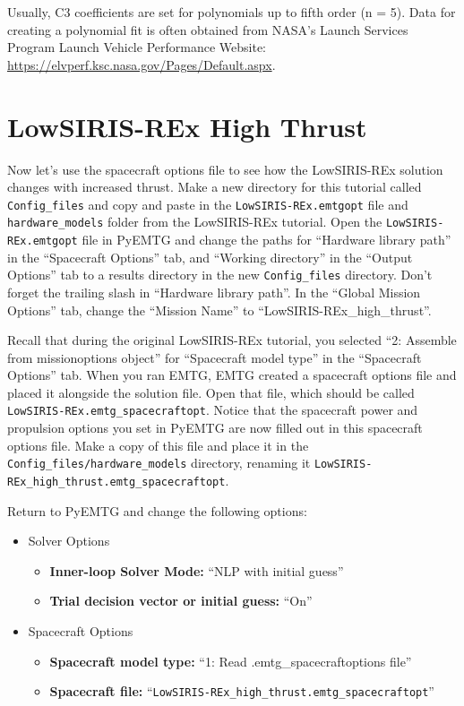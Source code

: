 \documentclass[11pt]{article}
\begin{document}
\noindent Usually, C3 coefficients are set for polynomials up to fifth order (n = 5). Data for creating a polynomial fit is often obtained from \acs{NASA}’s Launch Services Program Launch Vehicle Performance Website: \url{https://elvperf.ksc.nasa.gov/Pages/Default.aspx}.


\section{LowSIRIS-REx High Thrust}
\label{sec:lowsiris_rex_high_thrust}

Now let’s use the spacecraft options file to see how the LowSIRIS-REx solution changes with increased thrust. Make a new directory for this tutorial called \texttt{Config\_files} and copy and paste in the \texttt{LowSIRIS-REx.emtgopt} file and \texttt{hardware\_models} folder from the LowSIRIS-REx tutorial. Open the \texttt{LowSIRIS-REx.emtgopt} file in PyEMTG and change the paths for ``Hardware library path'' in the ``Spacecraft Options'' tab,  and ``Working directory'' in the ``Output Options'' tab to a results directory in the new \texttt{Config\_files} directory. Don’t forget the trailing slash in ``Hardware library path''. In the ``Global Mission Options'' tab, change the ``Mission Name'' to ``LowSIRIS-REx\_high\_thrust”.

\noindent Recall that during the original LowSIRIS-REx tutorial, you selected ``2: Assemble from missionoptions object'' for ``Spacecraft model type'' in the ``Spacecraft Options'' tab. When you ran \ac{EMTG}, \ac{EMTG} created a spacecraft options file and placed it alongside the solution file. Open that file, which should be called \texttt{LowSIRIS-REx.emtg\_spacecraftopt}. Notice that the spacecraft power and propulsion options you set in PyEMTG are now filled out in this spacecraft options file. Make a copy of this file and place it in the \texttt{Config\_files/hardware\_models} directory, renaming it \texttt{LowSIRIS-REx\_high\_thrust.emtg\_spacecraftopt}. 

\noindent Return to PyEMTG and change the following options:

\begin{itemize}
	\item Solver Options
	\begin{itemize}
		\item \textbf{Inner-loop Solver Mode:} ``\ac{NLP} with initial guess''
		\item \textbf{Trial decision vector or initial guess:} ``On''
	\end{itemize}
	\item Spacecraft Options
	\begin{itemize}
		\item \textbf{Spacecraft model type:} ``1: Read .emtg\_spacecraftoptions file''
		\item \textbf{Spacecraft file:} ``\texttt{LowSIRIS-REx\_high\_thrust.emtg\_spacecraftopt}''
	\end{itemize}
\end{itemize}
\end{document}
